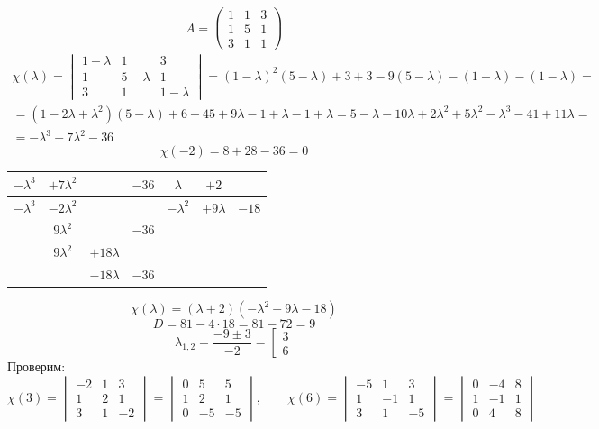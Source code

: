 \section{}

$$ A =
\begin{pmatrix}
	1 & 1 & 3 \\
    1 & 5 & 1 \\
    3 & 1 & 1
\end{pmatrix} $$
\begin{multline*}
    \chi(\lambda) =
    \begin{vmatrix}
        1 - \lambda & 1 & 3 \\
        1 & 5 - \lambda & 1 \\
        3 & 1 & 1 - \lambda
    \end{vmatrix} = (1 - \lambda)^2(5 - \lambda) + 3 + 3 -  9(5 - \lambda) - (1 - \lambda) - (1 - \lambda) = \\
    = (1 - 2\lambda + \lambda^2)(5 - \lambda) + 6 - 45 + 9\lambda - 1 + \lambda - 1 + \lambda = 5 - \lambda - 10\lambda + 2\lambda^2 + 5\lambda^2 - \lambda^3 - 41 + 11\lambda = \\
    = -\lambda^3 + 7\lambda^2 - 36
\end{multline*}
$$ \chi(-2) = 8 + 28 - 36 = 0 $$
\begin{tabular}{c c c c | c c c}
	$ -\lambda^3 $ & $ + 7\lambda^2 $ & & $ - 36 $ & $ \lambda $ & $ + 2 $ \\
    \hline
    $ -\lambda^3 $ & $ - 2\lambda^2 $ & & & $ -\lambda^2 $ & $ + 9\lambda $ & $ - 18 $ \\
    \hline
    & $ 9\lambda^2 $ & & $ -36 $ \\
    & $ 9\lambda^2 $ & $ + 18\lambda $ & \\
    \hline
    & & $ - 18\lambda $ & $ -36 $
\end{tabular}
$$ \chi(\lambda) = (\lambda + 2)(-\lambda^2 + 9\lambda - 18) $$
$$ D = 81 - 4 \cdot 18 = 81 - 72 = 9 $$
$$ \lambda_{1,2} = \frac{-9 \pm 3}{-2} = \left[
\begin{array}{c}
	3 \\
    6
\end{array} \right. $$
Проверим:
$$ \chi(3) =
\begin{vmatrix}
    -2 & 1 & 3 \\
    1 & 2 & 1 \\
    3 & 1 & -2
\end{vmatrix} =
\begin{vmatrix}
    0 & 5 & 5 \\
    1 & 2 & 1 \\
    0 & -5 & -5
\end{vmatrix}, \qquad \chi(6) =
\begin{vmatrix}
    -5 & 1 & 3 \\
    1 & -1 & 1 \\
    3 & 1 & -5
\end{vmatrix} =
\begin{vmatrix}
    0 & -4 & 8 \\
    1 & -1 & 1 \\
    0 & 4 & 8
\end{vmatrix} $$
